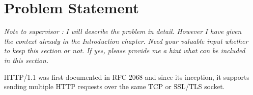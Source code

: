 \chapter{Problem Statement}
\textit{Note to supervisor : I will describe the problem in detail. However I have given the context already in the Introduction chapter. Need your valuable input whether to keep this section or not. If yes, please provide me a hint what can be included in this section. }

HTTP/1.1 was first documented in RFC 2068 \cite{b9} and since its inception, it supports sending multiple HTTP requests over the same TCP or SSL/TLS socket. 